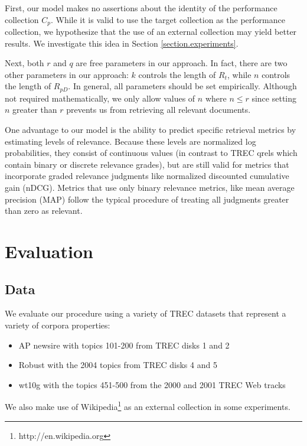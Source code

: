 \documentclass{sig-alternate}
\begin{document}
First, our model makes no assertions about the identity of the performance collection $C_p$. While it is valid to use the target collection as the performance collection, we hypothesize that the use of an external collection may yield better results. We investigate this idea in Section \ref{section.experiments}.

Next, both $r$ and $q$ are free parameters in our approach. In fact, there are two other parameters in our approach: $k$ controls the length of $R_t$, while $n$ controls the length of $R_{pD}$. In general, all parameters should be set empirically. Although not required mathematically, we only allow values of $n$ where $n \leq r$ since setting $n$ greater than $r$ prevents us from retrieving all relevant documents.

One advantage to our model is the ability to predict specific retrieval metrics by estimating levels of relevance. Because these levels are normalized log probabilities, they consist of continuous values (in contrast to TREC qrels which contain binary or discrete relevance grades), but are still valid for metrics that incorporate graded relevance judgments like normalized discounted cumulative gain (nDCG). Metrics that use only binary relevance metrics, like mean average precision (MAP) follow the typical procedure of treating all judgments greater than zero as relevant. 

\section{Evaluation}\label{section.evaluation}

\subsection{Data}\label{section.evaluation.data}

We evaluate our procedure using a variety of TREC datasets that represent a variety of corpora properties:

\begin{itemize}
	\item AP newsire with topics 101-200 from TREC disks 1 and 2
	\item Robust with the 2004 topics from TREC disks 4 and 5
	\item wt10g with the topics 451-500 from the 2000 and 2001 TREC Web tracks
\end{itemize}

We also make use of Wikipedia\footnote{http://en.wikipedia.org} as an external collection in some experiments.
\end{document}
